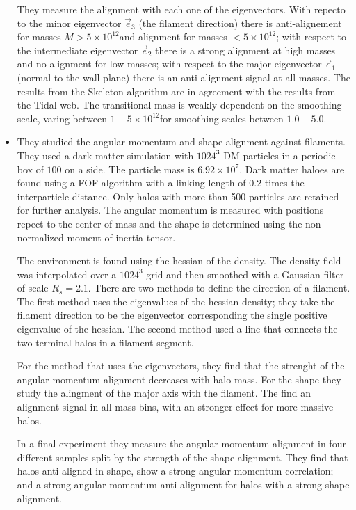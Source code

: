 \documentclass[useAMS,usenatbib]{mn2e}
\newcommand{\hMpc}{{\ifmmode{h^{-1}{\rm Mpc}}\else{$h^{-1}$Mpc }\fi}}
\newcommand{\hMsun}{{\ifmmode{h^{-1}{\rm
        {M_{\odot}}}}\else{$h^{-1}{\rm{M_{\odot}}}$~}\fi}}
\newcommand{\Msun}{{\ifmmode{{\rm {M_{\odot}}}}\else{${\rm{M_{\odot}}}$}\fi}}
\begin{document}
\begin{itemize}
They measure the alignment with each one of the eigenvectors. With
repecto to the minor eigenvector $\vec{e}_{3}$  (the filament direction) there is anti-alignement for masses $M>5\times10^{12}$\Msun and alignment for masses
$<5\times 10^{12}$\Msun; with respect to the intermediate eigenvector $\vec{e}_2$
there is a strong alignment at high masses and no alignment for low
masses; with respect to the major eigenvector $\vec{e}_{1}$
(normal to the wall plane) there is an anti-alignment signal at all
masses. The results from the Skeleton algorithm are in
agreement with the results from the Tidal web.  The transitional mass
is weakly dependent on the smoothing scale, varing between $1-5\times
10^{12}$\hMsun for smoothing scales between $1.0-5.0$\hMpc. 


\item
\citep{Zhang2009}

They studied the angular momentum and shape alignment against
filaments.  They used a dark matter simulation with $1024^3$ DM particles in a
periodic box of $100$ \hMpc on a side. The particle mass is
$6.92\times10^{7}$\hMsun. Dark matter haloes are found using a FOF
algorithm with a linking length of 0.2 times the interparticle
distance. Only halos with more than 500 particles are retained for
further analysis. The angular momentum is measured with positions
repect to the center of mass and the shape is determined using the
non-normalized moment of inertia tensor.

The environment is found using the hessian of the density. The density
field was interpolated over a $1024^3$ grid and then smoothed with a
Gaussian filter of scale $R_{s} = 2.1$\hMpc. There are two methods to
define the direction of a filament. The first method uses the
eigenvalues of the hessian density; they take the filament
direction to be the eigenvector corresponding the single positive
eigenvalue of the hessian. The second method used a line that
connects the two terminal halos in a filament segment.

For the method that uses the eigenvectors, they find that the strenght
of the angular momentum alignment decreases with halo mass. For the
shape they study the alingment of the major axis with the
filament. The find an alignment signal in all mass bins, with an
stronger effect for more massive halos.  

In a final experiment they measure the angular momentum alignment in four
different samples split by the strength of the shape alignment. They
find that halos anti-aligned in shape, show a strong angular momentum
correlation; and a strong angular momentum anti-alignment for halos
with a strong shape alignment. 


\end{itemize}
\end{document}
